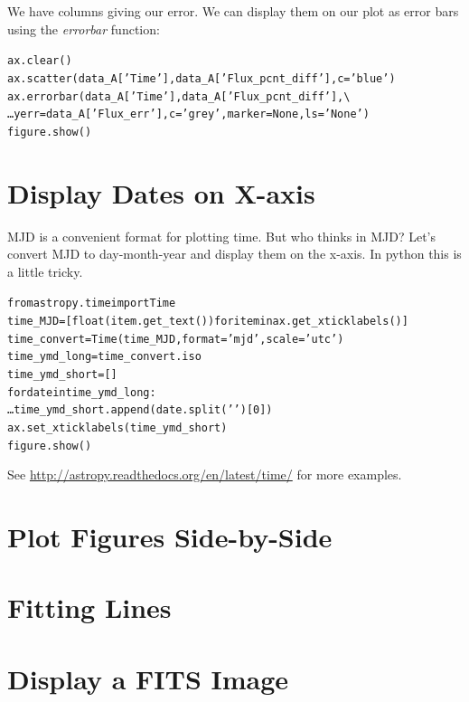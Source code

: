 We have columns giving our error. We can display them on our plot as
error bars using the \textit{errorbar} function:

\begin{alltt}
\pytab ax.clear()
\pytab ax.scatter(data_A['Time'], data_A['Flux_pcnt_diff'], c='blue')
\pytab ax.errorbar(data_A['Time'], data_A['Flux_pcnt_diff'], \textbackslash 
\ldots yerr=data_A['Flux_err'], c='grey', marker=None, ls='None')
\pytab figure.show()
\end{alltt}


\section{Display Dates on X-axis}

MJD is a convenient format for plotting time. But who 
thinks in MJD? Let's convert MJD to day-month-year and display them 
on the x-axis. In python this is a little tricky.

\begin{alltt}
\pytab from astropy.time import Time
\pytab time_MJD = [float(item.get_text()) for item in ax.get_xticklabels()]
\pytab time_convert = Time(time_MJD, format='mjd', scale='utc')
\pytab time_ymd_long = time_convert.iso
\pytab time_ymd_short = []
\pytab for date in time_ymd_long:
\ldots    time_ymd_short.append(date.split(' ')[0])
\pytab ax.set_xticklabels(time_ymd_short)
\pytab figure.show()
\end{alltt}


See \href{http://astropy.readthedocs.org/en/latest/time/}{http://astropy.readthedocs.org/en/latest/time/} for more examples.



\section{Plot Figures Side-by-Side}



\section{Fitting Lines}



\section{Display a FITS Image}


